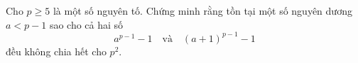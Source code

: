 \ifshowproblem
\begin{problem}\label{example:RUS-2015-TST-D7-P4}
    Cho \( p \geq 5 \) là một số nguyên tố.  
    Chứng minh rằng tồn tại một số nguyên dương \( a < p - 1 \) sao cho cả hai số 
    \[
        a^{p - 1} - 1 \quad \text{và} \quad (a + 1)^{p - 1} - 1
    \]
    đều không chia hết cho \( p^2 \).
\end{problem}
\fi

\footnotemark
{}
\fi